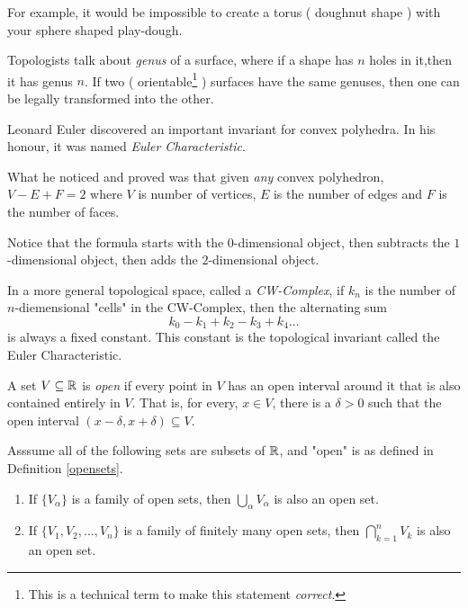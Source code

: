 For example, it would be impossible to create a torus ( doughnut shape ) with your sphere shaped play-dough.

Topologists talk about \emph{genus} of a surface, where if a shape has $n$ holes in it,then it has genus $n$. If two ( orientable\footnote{This is a technical term to make this statement \emph{correct}.} ) surfaces have the same genuses, then one can be legally transformed into the other.

Leonard Euler discovered an important invariant for convex polyhedra. In his honour, it was named \emph{Euler Characteristic}.

What he noticed and proved was that given \emph{any} convex polyhedron, $V - E + F = 2$ where $V$ is number of vertices, $E$ is the number of edges and $F$ is the number of faces.

Notice that the formula starts with the $0$-dimensional object, then subtracts the $1$-dimensional object, then adds the $2$-dimensional object.

In a more general topological space, called a \emph{CW-Complex}, if $k_n$ is the number of $n$-diemensional "cells" in the CW-Complex, then the alternating sum
$$k_0 - k_1 + k_2 - k_3 + k_4 ... $$
is always a fixed constant. This constant is the topological invariant called the Euler Characteristic.

\begin{definition}\label{opensets}
	A set $V \subseteq \mathbb{R}$ is \emph{open} if every point in $V$ has an open interval around it that is also contained entirely in $V$.
	That is, for every, $x \in V$, there is a $\delta > 0$ such that the open interval $(x - \delta, x + \delta) \subseteq V$.
\end{definition}

\begin{theorem}
	Asssume all of the following sets are subsets of $\mathbb{R}$, and "open" is as  defined in Definition \ref{opensets}.
	\begin{enumerate}
		\item If $\{ V_{\alpha} \}$ is a family of open sets, then $\displaystyle \bigcup_{\alpha} V_{\alpha}$ is also an open set.


		\item If $\{V_1, V_2, ..., V_n\}$ is a family of finitely many open sets, then $\displaystyle \bigcap_{k=1}^n V_k$ is also an open set.
	\end{enumerate}
\end{theorem}


